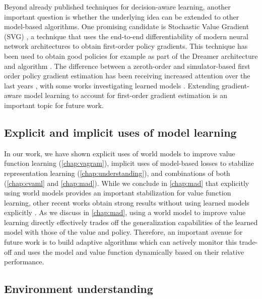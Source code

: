 Beyond already published techniques for decision-aware learning, another important question is whether the underlying idea can be extended to other model-based algorithms.
One promising candidate is Stochastic Value Gradient (SVG) \parencite{heess2015learning,amos2021model}, a technique that uses the end-to-end differentiability of modern neural network architectures to obtain first-order policy gradients.
This technique has been used to obtain good policies for example as part of the Dreamer architecture and algorithm \parencite{hafner2020dream}.
The difference between a zeroth-order and simulator-based first order policy gradient estimation has been receiving increased attention over the last years \parencite{xu2022accelerated,suh2022differentiable,antonova2022rethinking,georgiev2024adaptive}, with some works investigating learned models \parencite{ma2024transformer,georgiev2024adaptive}.
Extending gradient-aware model learning to account for first-order gradient estimation is an important topic for future work.

\subsection{Explicit and implicit uses of model learning}

In our work, we have shown explicit uses of world models to improve value function learning (\autoref{chap:vagram}), implicit uses of model-based losses to stabilize representation learning (\autoref{chap:understanding}), and combinations of both (\autoref{chap:cvaml} and \autoref{chap:mad}).
While we conclude in \autoref{chap:mad} that explicitly using world models provides an important stabilization for value function learning, other recent works obtain strong results without using learned models explicitly \parencite{fujimoto2025towards}.
As we discuss in \autoref{chap:mad}, using a world model to improve value learning directly effectively trades off the generalization capabilities of the learned model with those of the value and policy.
Therefore, an important avenue for future work is to build adaptive algorithms which can actively monitor this trade-off and uses the model and value function dynamically based on their relative performance.


\subsection{Environment understanding}


